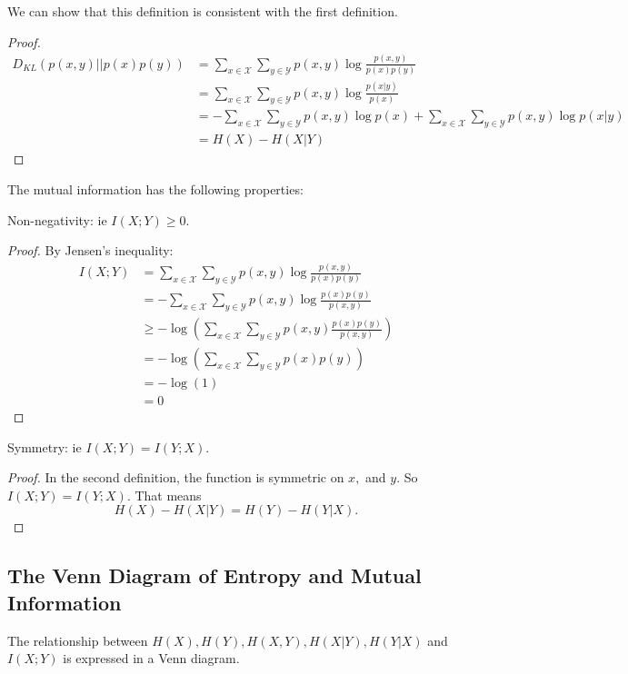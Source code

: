 We can show that this definition is consistent with the first definition. 

\begin{proof}
\begin{align*}
    D_{KL}(p(x,y)||p(x)p(y)) &= \sum_{x\in\mathcal{X}}\sum_{y\in \mathcal{Y}} p(x,y) \log \frac{p(x,y)}{p(x)p(y)} \\
    &= \sum_{x\in\mathcal{X}}\sum_{y\in \mathcal{Y}} p(x,y) \log \frac{p(x|y)}{p(x)} \\
    &= - \sum_{x\in\mathcal{X}} \sum_{y\in \mathcal{Y}} p(x,y) \log p(x) + \sum_{x\in\mathcal{X}} \sum_{y\in \mathcal{Y}} p(x,y) \log p(x|y) \\
    &= H(X) - H(X|Y)
\end{align*}
    
\end{proof}


The mutual information has the following properties:

\begin{proposition}
Non-negativity: ie \(I(X;Y) \geq 0\).     
\end{proposition}
\begin{proof}
    By Jensen's inequality:
    \begin{align*}
      I(X;Y) &=  \sum_{x\in\mathcal{X}}\sum_{y\in \mathcal{Y}} p(x,y) \log \frac{p(x,y)}{p(x)p(y)}\\
             &= - \sum_{x\in\mathcal{X}}\sum_{y\in \mathcal{Y}} p(x,y) \log \frac{p(x)p(y)}{p(x,y)}\\
             &\geq - \log (\sum_{x\in\mathcal{X}}\sum_{y\in \mathcal{Y}} p(x,y) \frac{p(x)p(y)}{p(x,y)} ) \\
             &= -\log (\sum_{x\in\mathcal{X}}\sum_{y\in \mathcal{Y}} p(x)p(y)) \\
             &= -\log(1) \\
             &= 0  
    \end{align*}
\end{proof}

\begin{proposition}
Symmetry: ie \(I(X;Y) = I(Y;X)\).    
\end{proposition}
\begin{proof}
    In the second definition, the function is symmetric on \(x,\) and \(y\). So \(I(X;Y)=I(Y;X)\). That means 
    \[H(X) - H(X|Y) = H(Y) - H(Y|X).\]
\end{proof}


\subsection{The Venn Diagram of Entropy and Mutual Information}
The relationship between \(H(X), H(Y), H(X,Y), H(X|Y), H(Y|X)\) and \(I(X;Y)\) is expressed in a Venn diagram. 


